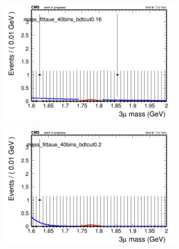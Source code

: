 \begin{figure}[H]
\begin{subfigure}{0.2\textwidth}
        \caption{}
    \end{subfigure}
    \begin{subfigure}{0.2\textwidth}
        \includegraphics[width=\textwidth]{unfixed_exp/plots/taue/massfit_taue_40bins_bdtcut0.16.png}
        \caption{}
    \end{subfigure}
    \begin{subfigure}{0.2\textwidth}
        \includegraphics[width=\textwidth]{unfixed_exp/plots/taue/massfit_taue_40bins_bdtcut0.2.png}
        \caption{}
    \end{subfigure}
    \begin{subfigure}{0.2\textwidth}

\end{subfigure}
\end{figure}
